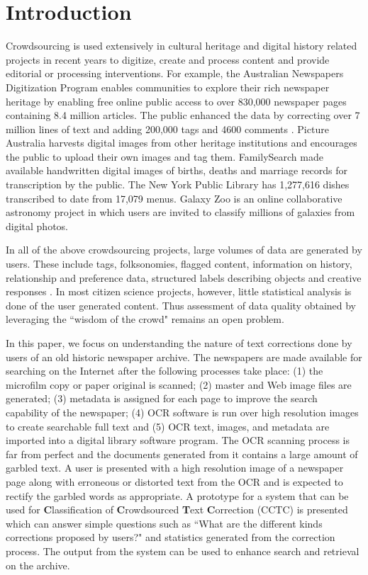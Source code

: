 \documentclass[letterpaper]{article}
\begin{document}
\section{Introduction}
\label{sec:intro}

Crowdsourcing is used extensively in cultural heritage and digital history related projects in recent years to 
digitize, create and process content and provide editorial or processing interventions. For example, the Australian Newspapers Digitization Program \cite{ADNP} enables communities to explore their rich newspaper heritage by enabling free online public access to over 830,000 newspaper pages containing 8.4 million articles. The public enhanced the data by correcting over 7 million lines of text and adding 200,000 tags and 4600 comments \cite{holley_09}. Picture Australia \cite{pictAus} harvests digital images from other heritage institutions and encourages the public to upload their own images and tag them. FamilySearch \cite{famSearch} made available handwritten digital images of births, deaths and marriage records for transcription by the public. The New York Public Library has 1,277,616 dishes transcribed to date from 17,079 menus. Galaxy Zoo \cite{galZoo}is an online collaborative astronomy project in which users are invited to classify millions of galaxies from digital photos. 

In all of the above crowdsourcing projects, large volumes of data are generated by users. These include tags, folksonomies, flagged content, information on history, relationship and preference data, structured labels describing objects and creative responses \cite{Ridge_11}. In most citizen science projects, however, little statistical analysis is done of the user generated content. Thus assessment of data quality obtained by leveraging the ``wisdom of the crowd" remains an open problem. 


In this paper, we focus on understanding the nature of text corrections done by users of an old historic newspaper archive. The newspapers are made available for searching on the Internet after the following processes take place: (1) the microfilm copy or paper original is scanned; (2) master and Web image files are generated; (3) metadata is assigned for each page to improve the search capability of the newspaper; (4) OCR software is run over high resolution images to create searchable full text and (5) OCR text, images, and metadata are imported into a digital library software program. The OCR scanning process is far from perfect and the documents generated from it contains a large amount of garbled text. A user is presented with a high resolution image of a newspaper page along with erroneous or distorted text from the OCR and is expected to rectify the garbled words as appropriate. A prototype for a system that can be used for \textbf{C}lassification of \textbf{C}rowdsourced \textbf{T}ext \textbf{C}orrection (CCTC) is presented which can answer simple questions such as ``What are the different kinds corrections proposed by users?" and statistics generated from the correction process. 
The output from the system can be used to enhance search and retrieval on the archive.
\end{document}
